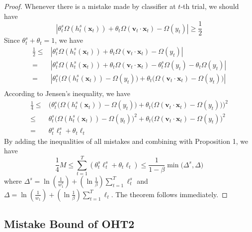 \documentclass{article} %
\theoremstyle{remark}
\theoremstyle{definition}
\begin{document}
\begin{proof}
Whenever there is a mistake made by classifier at $t$-th trial, we should have 
$$ | \theta_{t}^{s} \varOmega(h_{t}^{s}(\mathbf{x}_t)) + \theta_t \varOmega(\mathbf{v}_t \cdot \mathbf{x}_t) - \varOmega(y_t) | \geq \frac{1}{2} $$
Since $\theta_{t}^{s} + \theta_t = 1$, we have
\begin{equation*}
\begin{split}
\frac{1}{2} \leq 
  & | \theta_{t}^{s} \varOmega(h_{t}^{s}(\mathbf{x}_t)) + \theta_t \varOmega(\mathbf{v}_t \cdot \mathbf{x}_t) - \varOmega(y_t) | \\
= & | \theta_{t}^{s} \varOmega(h_{t}^{s}(\mathbf{x}_t)) + \theta_t \varOmega(\mathbf{v}_t \cdot \mathbf{x}_t) - \theta_{t}^{s} \varOmega(y_t) - \theta_t \varOmega(y_t) | \\
= & | \theta_{t}^{s} \big( \varOmega(h_{t}^{s}(\mathbf{x}_t)) - \varOmega(y_t) \big) + \theta_t \big( \varOmega(\mathbf{v}_t \cdot \mathbf{x}_t) - \varOmega(y_t) \big) | \\
\end{split}
\end{equation*}
According to Jensen's inequality, we have
\begin{equation*}
\begin{split}
\frac{1}{4} 
\leq & \Big( \theta_{t}^{s} \big( \varOmega(h_{t}^{s}(\mathbf{x}_t)) - \varOmega(y_t) \big) + \theta_t \big( \varOmega(\mathbf{v}_t \cdot \mathbf{x}_t) - \varOmega(y_t) \big) \Big) ^ 2 \\
\leq & \theta_{t}^{s} \Big( \varOmega(h_{t}^{s}(\mathbf{x}_t)) - \varOmega(y_t) \Big) ^ 2 + \theta_t \Big( \varOmega(\mathbf{v}_t \cdot \mathbf{x}_t) - \varOmega(y_t) \Big) ^ 2 \\
   = & \theta_{t}^{s} \ell_{t}^{s} + \theta_t \ell_t 
\end{split}
\end{equation*}
By adding the inequalities of all mistakes and combining with Proposition 1, we have
$$ \frac{1}{4}M \leq \sum\limits_{t=1}^{T} ( \theta_{t}^{s} \ell_{t}^{s} + \theta_t \ell_t ) \leq \frac{1}{1-\beta} \min \big( \varDelta^s, \varDelta \big) $$
where
$ \varDelta^s = \ln(\frac{1}{w_{1}^{s}}) + (\ln \frac{1}{\beta}) \sum\limits_{t=1}^{T} \ell_{t}^{s} $ and $ \varDelta = \ln(\frac{1}{w_{1}}) + (\ln \frac{1}{\beta}) \sum\limits_{t=1}^{T} \ell_{t} $.
The theorem follows immediately.
\end{proof}

\subsection{Mistake Bound of OHT2}
\end{document}
